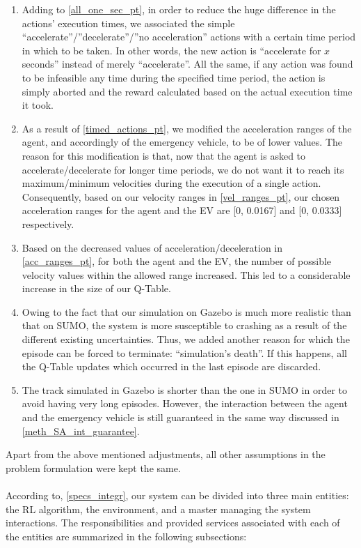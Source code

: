 \begin{enumerate}
    \label{all_one_sec_pt}
    \item Adding to \ref{all_one_sec_pt}, in order to reduce the huge difference in the actions’ execution times, we associated the simple “accelerate”/”decelerate”/”no acceleration” actions with a certain time period in which to be taken. In other words, the new action is “accelerate for \(x\) seconds” instead of merely “accelerate”. All the same, if any action was found to be infeasible any time during the specified time period, the action is simply aborted and the reward calculated based on the actual execution time it took.
    \label{timed_actions_pt}
    \item As a result of \ref{timed_actions_pt}, we modified the acceleration ranges of the agent, and accordingly of the emergency vehicle, to be of lower values. The reason for this modification is that, now that the agent is asked to accelerate/decelerate for longer time periods, we do not want it to reach its maximum/minimum velocities during the execution of a single action. Consequently, based on our velocity ranges in \ref{vel_ranges_pt}, our chosen acceleration ranges for the agent and the EV are [0, 0.0167] and [0, 0.0333] respectively.
    \label{acc_ranges_pt}
    \item Based on the decreased values of acceleration/deceleration in \ref{acc_ranges_pt}, for both the agent and the EV, the number of possible velocity values within the allowed range increased. This led to a considerable increase in the size of our Q-Table.
    \item Owing to the fact that our simulation on Gazebo is much more realistic than that on SUMO, the system is more susceptible to crashing as a result of the different existing uncertainties. Thus, we added another reason for which the episode can be forced to terminate: “simulation’s death”. If this happens, all the Q-Table updates which occurred in the last episode are discarded.
    \item The track simulated in Gazebo is shorter than the one in SUMO in order to avoid having very long episodes. However, the interaction between the agent and the emergency vehicle is still guaranteed in the same way discussed in \ref{meth_SA_int_guarantee}.
\end{enumerate}
Apart from the above mentioned adjustments, all other assumptions in the problem formulation were kept the same.
\\ \\
According to, \ref{specs_integr}, our system can be divided into three main entities: the RL algorithm, the environment, and a master managing the system interactions. The responsibilities and provided services associated with each of the entities are summarized in the following subsections:

